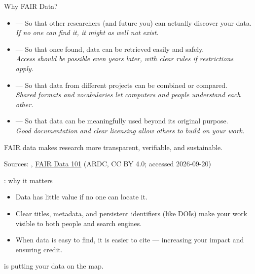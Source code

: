 \documentclass[aspectratio=169]{beamer}
\begin{document}
\begin{frame}{Why FAIR Data?}
\begin{itemize}
  \item {} — So that other researchers (and future you) can actually discover your data.  
 \\ \quad  \emph{If no one can find it, it might as well not exist.}

  \item {} — So that once found, data can be retrieved easily and safely.  
 \\ \quad \emph{Access should be possible even years later, with clear rules if restrictions apply.}

  \item {} — So that data from different projects can be combined or compared.  
 \\ \quad  \emph{Shared formats and vocabularies let computers and people understand each other.}

  \item {} — So that data can be meaningfully used beyond its original purpose.  
 \\ \quad  \emph{Good documentation and clear licensing allow others to build on your work.}
\end{itemize}

\medskip
FAIR data makes research more transparent, verifiable, and sustainable.

\tiny Sources: \citep{FAIR2016}, 
\href{https://au-research.github.io/FAIR-data-101-training/}{FAIR Data 101} (ARDC, CC BY 4.0; accessed 2026-09-20)
\end{frame}
\begin{frame}{: why it matters}
\begin{itemize}
  \item Data has little value if no one can locate it.  
  \item Clear titles, metadata, and persistent identifiers (like DOIs) make your work visible to both people and search engines.  
  \item When data is easy to find, it is easier to cite — increasing your impact and ensuring credit.
\end{itemize}
\medskip
{} is putting your data on the map.
\end{frame}
\end{document}
